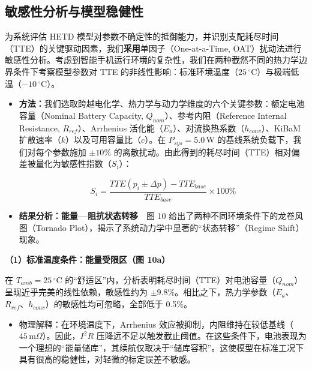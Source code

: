 \documentclass[11pt,a4paper]{ctexart}
\begin{document}
\subsection{敏感性分析与模型稳健性}

为系统评估 HETD 模型对参数不确定性的抵御能力，并识别支配耗尽时间（TTE）的关键驱动因素，我们\textbf{采用}单因子（One-at-a-Time, OAT）扰动法进行敏感性分析。考虑到智能手机运行环境的复杂性，我们在两种截然不同的热力学边界条件下考察模型参数对 TTE 的非线性影响：标准环境温度（$25\,^{\circ}\mathrm{C}$）与极端低温（$-10\,^{\circ}\mathrm{C}$）。

\begin{itemize}[leftmargin=1.6em,itemsep=0.4em]
\item \textbf{方法：}我们选取跨越电化学、热力学与动力学维度的六个关键参数：额定电池容量（Nominal Battery Capacity, $Q_{nom}$）、参考内阻（Reference Internal Resistance, $R_{ref}$）、Arrhenius 活化能（$E_a$）、对流换热系数（$h_{conv}$）、KiBaM 扩散速率（$k$）以及可用容量比（$c$）。在 $P_{sys} = 5.0\,\mathrm{W}$ 的基线系统负载下，我们对每个参数施加 $\pm 10\%$ 的离散扰动。由此得到的耗尽时间（TTE）相对偏差被量化为敏感性指数（$S_i$）：

\begin{equation*}
S_i = \frac{TTE(p_i \pm \Delta p) - TTE_{base}}{TTE_{base}} \times 100\%
\end{equation*}

\item \textbf{结果分析：能量—阻抗状态转移}　图 10 给出了两种不同环境条件下的龙卷风图（Tornado Plot），揭示了系统动力学中显著的“状态转移”（Regime Shift）现象。
\end{itemize}

\noindent\textbf{（1）标准温度条件：能量受限区（图 10a）}

在 $T_{amb} = 25\,^{\circ}\mathrm{C}$ 的“舒适区”内，分析表明耗尽时间（TTE）对电池容量（$Q_{nom}$）呈现近乎完美的线性依赖，敏感性约为 $\pm 9.8\%$。相比之下，热力学参数（$E_a$、$R_{ref}$、$h_{conv}$）的敏感性均可忽略，全部低于 0.5\%。

\begin{itemize}[leftmargin=1.6em,itemsep=0.4em]
\item 物理解释：在环境温度下，Arrhenius 效应被抑制，内阻维持在较低基线（$45\,\mathrm{m}\Omega$）。因此，$I^2R$ 压降远不足以触发截止阈值。在这些条件下，电池表现为一个理想的“能量储库”，其续航仅取决于“储库容积”。这使模型在标准工况下具有很高的稳健性，对轻微的标定误差不敏感。
\end{itemize}
\end{document}
